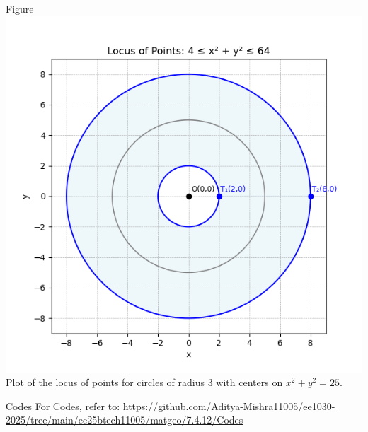 \documentclass{beamer}
\begin{document}
\begin{frame}{Figure}
    \centering
    \includegraphics[width=0.6\columnwidth]{Figs/Figure_1.png}
    \\[4pt]
    {\small Plot of the locus of points for circles of radius 3 with centers on $x^2 + y^2 = 25$.}
\end{frame}

\begin{frame}{Codes}
\centering
For Codes, refer to:  
\url{https://github.com/Aditya-Mishra11005/ee1030-2025/tree/main/ee25btech11005/matgeo/7.4.12/Codes}
\end{frame}
\end{document}
